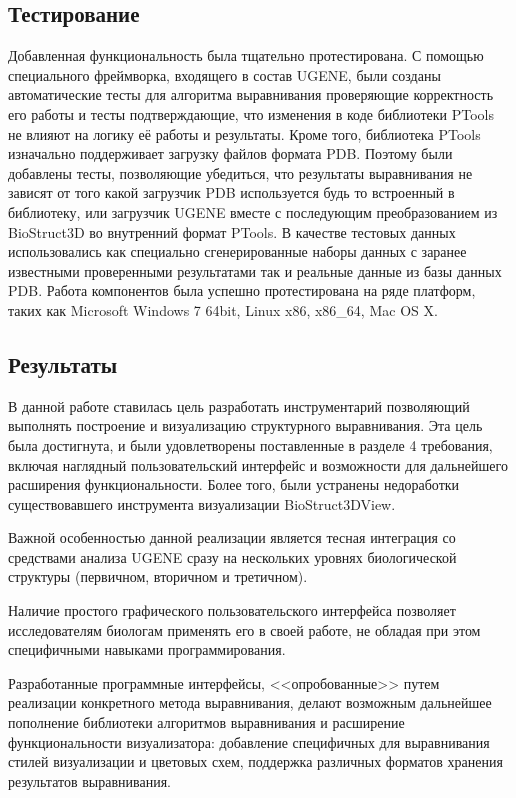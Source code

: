 \documentclass[a4paper, 12pt, titlepage, utf8]{extarticle}
\begin{document}
\subsection{Тестирование}
Добавленная функциональность была тщательно протестирована. С помощью специального фреймворка, входящего в состав UGENE, были созданы автоматические тесты для алгоритма выравнивания проверяющие корректность его работы и тесты подтверждающие, что изменения в коде библиотеки PTools не влияют на логику её работы и результаты. Кроме того, библиотека PTools изначально поддерживает загрузку файлов формата PDB. Поэтому были добавлены тесты, позволяющие убедиться, что результаты выравнивания не зависят от того какой загрузчик PDB используется будь то встроенный в библиотеку, или загрузчик UGENE вместе с последующим преобразованием из BioStruct3D во внутренний формат PTools. В качестве тестовых данных использовались как специально сгенерированные наборы данных с заранее известными проверенными результатами так и реальные данные из базы данных PDB. Работа компонентов была успешно протестирована на ряде платформ, таких как Microsoft Windows 7 64bit, Linux x86, x86\_64, Mac OS X.

\newpage
\subsection{Результаты}
В данной работе ставилась цель разработать инструментарий позволяющий выполнять построение и визуализацию структурного выравнивания. Эта цель была достигнута, и были удовлетворены поставленные в разделе 4 требования, включая наглядный пользовательский интерфейс и возможности для дальнейшего расширения функциональности. Более того, были устранены недоработки существовавшего инструмента визуализации BioStruct3DView.

Важной особенностью данной реализации является тесная интеграция со средствами анализа UGENE сразу на нескольких уровнях биологической структуры (первичном, вторичном и третичном). 

Наличие простого графического пользовательского интерфейса позволяет исследователям биологам применять его в своей работе, не обладая при этом специфичными навыками программирования.

Разработанные программные интерфейсы, <<опробованные>> путем реализации конкретного метода выравнивания, делают возможным дальнейшее пополнение библиотеки алгоритмов выравнивания и расширение функциональности визуализатора: добавление специфичных для выравнивания стилей визуализации и цветовых схем, поддержка различных форматов хранения результатов выравнивания.
\end{document}

